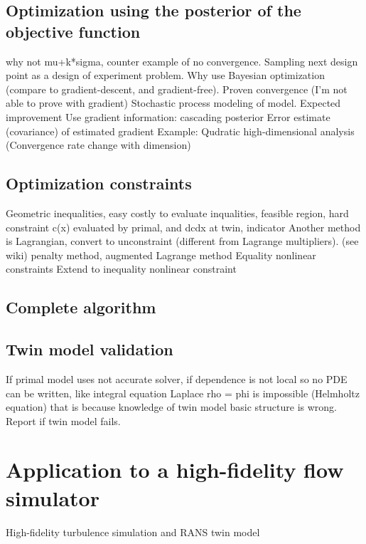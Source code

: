 \documentclass[a4paper,onecolumn]{article}
\theoremstyle{remark}
\begin{document}
\subsection{Optimization using the posterior of the objective function}
\label{bayesian_opt}
why not mu+k*sigma, counter example of no convergence.
Sampling next design point as a design of experiment problem.
Why use Bayesian optimization (compare to gradient-descent, and gradient-free). Proven convergence
(I'm not able to prove with gradient)
Stochastic process modeling of model.
Expected improvement
Use gradient information: cascading posterior
Error estimate (covariance) of estimated gradient
Example:
Qudratic high-dimensional analysis (Convergence rate change with dimension)
\subsection{Optimization constraints}
\label{constraints}
Geometric inequalities, easy
costly to evaluate inqualities, feasible region, hard
constraint c(x) evaluated by primal, and dcdx at twin, indicator
\cite{constraint Bayesian Opt}
Another method is Lagrangian, convert to unconstraint (different from Lagrange multipliers). 
(see wiki)
penalty method, augmented Lagrange method
Equality nonlinear constraints 
\cite{equality nonlinear constraint trust region opt}
Extend to inequality nonlinear constraint \cite{coarse discretization}

\subsection{Complete algorithm}
\label{complete algo}

\subsection{Twin model validation}
If primal model uses not accurate solver, if dependence is not local so no PDE can be written,
like integral equation
Laplace rho = phi is impossible (Helmholtz equation)
that is because knowledge of twin model basic structure is wrong.
Report if twin model fails.


\section{Application to a high-fidelity flow simulator}
\label{examples}
High-fidelity turbulence simulation and RANS twin model
\end{document}
